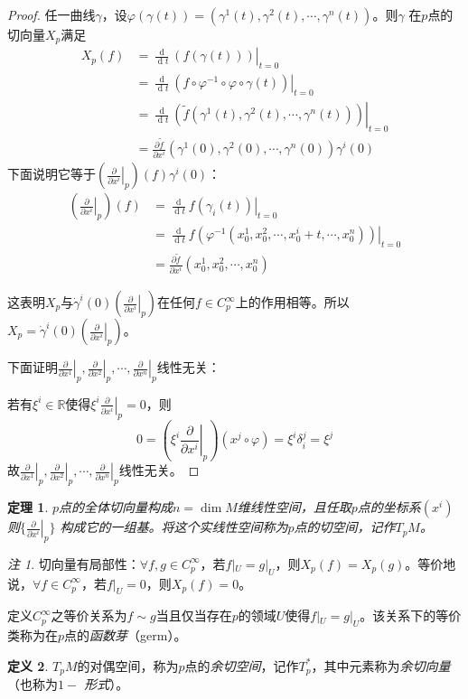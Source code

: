 \documentclass[winfonts,UTF8,c5size,a4paper,fancyhdr,hyperref,titlepage,nocap]{ctexart}
\newtheorem{thm}{定理}
\theoremstyle{definition}
\newtheorem{defn}[thm]{定义}
\theoremstyle{remark}
\newtheorem*{rem}{注}
\numberwithin{equation}{subsection}
\newcommand{\Real}{\mathbb{R}}
\newcommand{\red}{\color{red}}
\newcommand{\dt}{\frac{\operatorname{d}}{\operatorname{d}t}}
\newcommand{\pfrac}[2]{\frac{\partial{#1}}{\partial{#2}}}
\newcommand{\px}[1]{\left.\pfrac{}{x^{#1}}\right|_p}
\newcommand{\local}[2]{\left.{#1}\right|_{#2}}%
\newcommand{\localt}[1]{\local{#1}{t=0}}%
\begin{document}
\begin{proof}
  任一曲线$\gamma$，设$\varphi(\gamma(t))=(\gamma^1(t),\gamma^2(t),\cdots,\gamma^n(t))$。则$\gamma$ 在$p$点的切向量$X_p$满足
\begin{align*}
X_p(f)&=\localt{\dt(f(\gamma(t)))}\\
      &=\localt{\dt(f\circ\varphi^{-1}\circ\varphi\circ\gamma(t))}\\
      &=\localt{\dt(\widetilde{f}(\gamma^1(t),\gamma^2(t),\cdots,\gamma^n(t)))}\\
      &=\pfrac{\widetilde{f}}{x^i}(\gamma^1(0),\gamma^2(0),\cdots,\gamma^n(0))\gamma^i(0)
\end{align*}
下面说明它等于$(\px{i})(f)\gamma^i(0)$：
\begin{align*}
(\px{i})(f)&=\localt{\dt f(\gamma_i(t))}\\
           &=\localt{\dt f(\varphi^{-1}(x_0^1,x_0^2,\cdots,x_0^i+t,\cdots,x_0^n))}\\
           &=\pfrac{\widetilde{f}}{x^i}(x_0^1,x_0^2,\cdots,x_0^n)
\end{align*}

这表明$X_p$与$\dot{\gamma}^i(0)(\px{i})$在任何$f\in C^{\infty}_p$上的作用相等。所以$X_p=\dot{\gamma}^i(0)(\px{i})$。

下面证明$\px{1},\px{2},\cdots,\px{n}$线性无关：

若有$\xi^i\in\Real$使得$\xi^i\px{i}=0$，则
\begin{equation*}
0=(\xi^i\px{i})(x^j\circ\varphi)=\xi^i\delta^j_i=\xi^j
\end{equation*}
故$\px{1},\px{2},\cdots,\px{n}$线性无关。
\end{proof}
\begin{thm}
$p$点的全体切向量构成$n=\dim M$维线性空间，且任取$p$点的坐标系$(x^i)$则$\{\px{i}\}$ 构成它的一组基。将这个实线性空间称为$p$点的{\red 切空间}，记作$T_pM$。
\end{thm}
\begin{rem}
切向量有局部性：$\forall f,g\in C^{\infty}_p$，若$f|_U=g|_U$，则$X_p(f)=X_p(g)$。等价地说，$\forall f\in C^{\infty}_p$，若$f|_U=0$，则$X_p(f)=0$。

定义$C^{\infty}_p$之等价关系为$f\sim g$当且仅当存在$p$的领域$U$使得$f|_U=g|_U$。该关系下的等价类称为在$p$点的\emph{\red 函数芽}（germ）。
\end{rem}
\begin{defn}
$T_pM$的对偶空间，称为$p$点的\emph{\red 余切空间}，记作$T^{\ast}_p$，其中元素称为\emph{\red 余切向量}（也称为\emph{\red $1-$ 形式}）。
\end{defn}
\end{document}
